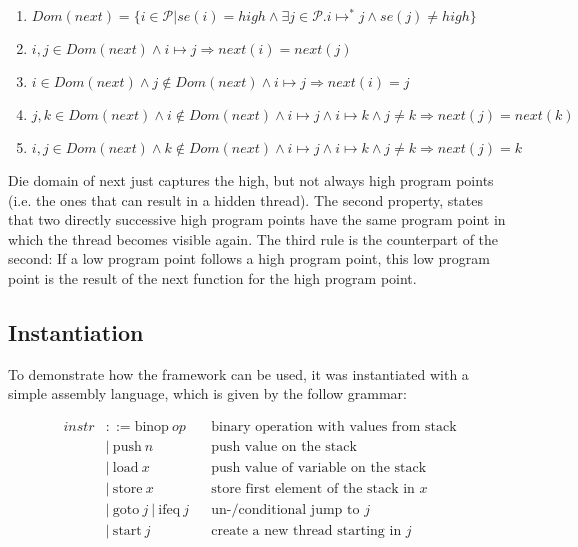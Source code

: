 \documentclass[a4paper,10pt]{llncs}
\begin{document}
\begin{enumerate}
\item $Dom(next) = \{i \in \mathcal{P} | se(i) = high \land \exists j \in \mathcal{P} . i \mapsto^* j \land se(j) \neq high\}$ 
\item $i, j \in Dom(next) \land i \mapsto j \Rightarrow next(i) = next(j)$
\item $i \in Dom(next) \land j \not\in Dom(next) \land i \mapsto j \Rightarrow next(i) = j$
\item $j, k \in Dom(next) \land i \not\in Dom(next) \land i \mapsto j \land i \mapsto k \land j \neq k \Rightarrow next(j) = next(k)$ 
\item $i, j \in Dom(next) \land k \not\in Dom(next) \land i \mapsto j \land i \mapsto k \land j \neq k \Rightarrow next(j) = k$
\end{enumerate}

Die domain of next just captures the high, but not always high program points (i.e. the ones
that can result in a hidden thread). The second property, states that two directly successive high
program points have the same program point in which the thread becomes visible again. The third rule
is the counterpart of the second: If a low program point follows a high program point, this low program
point is the result of the next function for the high program point.


\subsection{Instantiation}
\label{sec:instantiation}
To demonstrate how the framework can be used, it was instantiated with a simple
assembly language, which is given by the follow grammar:

\begin{align*}
instr &::= \text{binop}\ op && \text{binary operation with values from stack} \\
&|\ \text{push}\ n &&  \text{push value on the stack} \\
&|\ \text{load}\ x && \text{push value of variable on the stack} \\
&|\ \text{store}\ x && \text{store first element of the stack in $x$} \\
&|\ \text{goto}\ j\ |\ \text{ifeq}\ j && \text{un-/conditional jump to $j$} \\
&|\ \text{start}\ j && \text{create a new thread starting in $j$} \\
\end{align*}
\end{document}
